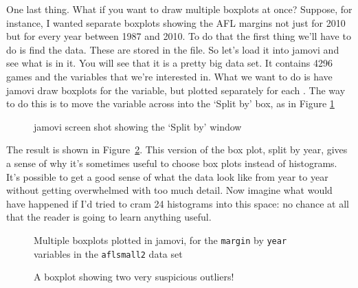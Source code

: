 One last thing. What if you want to draw multiple boxplots at once? Suppose, for instance, I wanted separate boxplots showing the AFL margins not just for 2010 but for every year between 1987 and 2010. To do that the first thing we'll have to do is find the data. These are stored in the  file. So let's load it into jamovi and see what is in it. You will see that it is a pretty big data set. It contains 4296 games and the variables that we're interested in. What we want to do is have jamovi draw boxplots for the  variable, but plotted separately for each  . The way to do this is to move the  variable across into the `Split by' box, as in Figure \ref{fig:splitfile1}

\begin{figure}[!!htb]
\begin{center}
\caption{jamovi screen shot showing the `Split by' window}
\label{fig:splitfile1}
\HR
\end{center}
\end{figure}

The result is shown in Figure~\ref{fig:boxplot3}. This version of the box plot, split by year, gives a sense of why it's sometimes useful to choose box plots instead of histograms. It's possible to get a good sense of what the data look like from year to year without getting overwhelmed with too much detail. Now imagine what would have happened if I'd tried to cram 24 histograms into this space: no chance at all that the reader is going to learn anything useful.

\begin{figure}[!!htb]
\begin{center}
\caption{Multiple boxplots plotted in jamovi, for the \texttt{margin} by \texttt{year} variables in the \texttt{aflsmall2} data set}
\label{fig:boxplot3}
\HR
\end{center}
\end{figure}


\begin{figure}[!!htb]
\begin{center}
\caption{A boxplot showing two very suspicious outliers!}
\label{fig:boxplot4}
\HR
\end{center}
\end{figure}

